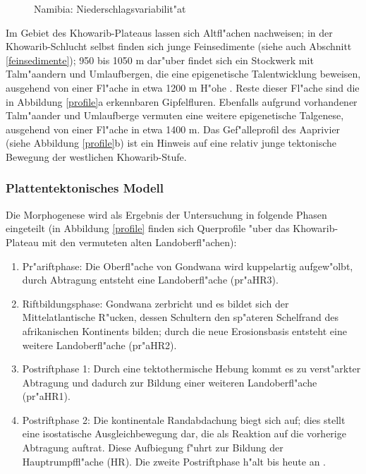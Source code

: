 \documentclass[titlepage,a4paper]{scrartcl}
\begin{document}
\begin{figure}
\begin{center}
\end{center}
\caption[Namibia: Niederschlagsvariabilit"at]{Namibia: Niederschlagsvariabilit"at }
\label{variab}
\end{figure}

Im Gebiet des Khowarib-Plateaus lassen sich Altfl"achen nachweisen; in der Khowarib-Schlucht selbst finden sich junge Feinsedimente (siehe auch Abschnitt \ref{feinsedimente}); 950 bis 1050 m dar"uber findet sich ein Stockwerk mit Talm"aandern und Umlaufbergen, die eine epigenetische Talentwicklung beweisen, ausgehend von einer Fl"ache in etwa 1200 m  H"ohe \citep[12]{BrunotteAndSpoenemann1997}. Reste dieser Fl"ache sind die in Abbildung \ref{profile}a erkennbaren Gipfelfluren. Ebenfalls aufgrund vorhandener Talm"aander und Umlaufberge vermuten \cite{BrunotteAndSpoenemann1997} eine weitere epigenetische Talgenese, ausgehend von einer Fl"ache in etwa 1400 m. Das Gef"alleprofil des Aaprivier (siehe Abbildung \ref{profile}b) ist ein Hinweis auf eine relativ junge tektonische Bewegung der westlichen Khowarib-Stufe.

\subsubsection{Plattentektonisches Modell}

Die Morphogenese wird als Ergebnis der Untersuchung in folgende Phasen eingeteilt (in Abbildung \ref{profile} finden sich Querprofile "uber das Khowarib-Plateau mit den vermuteten alten Landoberfl"achen):

\begin{enumerate}
\item Pr"ariftphase: Die Oberfl"ache von Gondwana wird kuppelartig aufgew"olbt, durch Abtragung entsteht eine Landoberfl"ache (pr"aHR3).
\item Riftbildungsphase: Gondwana zerbricht und es bildet sich der Mittelatlantische R"ucken, dessen Schultern den sp"ateren Schelfrand des afrikanischen Kontinents bilden; durch die neue Erosionsbasis entsteht eine weitere Landoberfl"ache (pr"aHR2).
\item Postriftphase 1: Durch eine tektothermische Hebung kommt es zu verst"arkter Abtragung und dadurch zur Bildung einer weiteren Landoberfl"ache (pr"aHR1).
\item Postriftphase 2: Die kontinentale Randabdachung biegt sich auf; dies stellt eine isostatische Ausgleichbewegung dar, die als Reaktion auf die vorherige Abtragung auftrat. Diese Aufbiegung f"uhrt zur Bildung der Hauptrumpffl"ache (HR). Die zweite Postriftphase h"alt bis heute an \citep{BrunotteAndSpoenemann1997}.
\end{enumerate}
\end{document}
